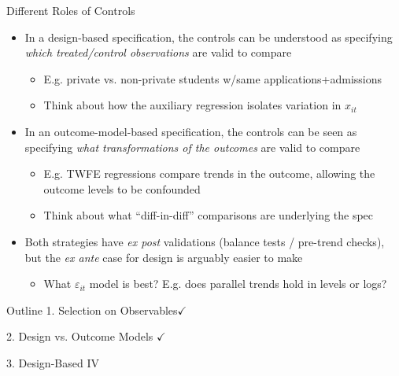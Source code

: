 \documentclass[11pt, english]{beamer}
\begin{document}
	\begin{frame}{Different Roles of Controls}
		\begin{itemize}
			\item In a design-based specification, the controls can be understood as
				specifying \emph{which treated/control observations} are valid to compare
				\smallskip
				\begin{itemize}
					\item E.g. private vs. non-private students w/same applications+admissions
						\smallskip
						\pause{}

					\item Think about how the auxiliary regression isolates variation in $x
						_{it}$
				\end{itemize}
				\bigskip
				\pause{}

			\item In an outcome-model-based specification, the controls can be seen as
				specifying \emph{what transformations of the outcomes} are valid to compare
				\smallskip
				\begin{itemize}
					\item E.g. TWFE regressions compare trends in the outcome, allowing the
						outcome levels to be confounded
						\smallskip
						\pause{}

					\item Think about what ``diff-in-diff'' comparisons are underlying the
						spec
				\end{itemize}
				\bigskip
				\pause{}

			\item Both strategies have \emph{ex post} validations (balance tests / pre-trend
				checks), but the \emph{ex ante} case for design is arguably easier to
				make
				\smallskip
				\begin{itemize}
					\item What $\varepsilon_{it}$ model is best? E.g. does parallel trends
						hold in levels or logs?
				\end{itemize}
		\end{itemize}
	\end{frame}

	\begin{frame}{Outline}
		\textcolor{red!75!green!50!blue!25!gray}{1. Selection on Observables}$\checkmark$
		\vspace{0.8cm}

		\textcolor{red!75!green!50!blue!25!gray}{2. Design vs. Outcome Models }$\checkmark$
		\vspace{0.8cm}

		3. Design-Based IV
	\end{frame}
\end{document}
